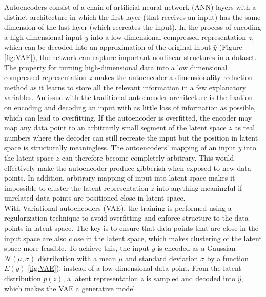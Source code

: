 \noindent
Autoencoders consist of a chain of artificial neural network (ANN) layers with a distinct architecture in which the first layer (that receives an input) has the same dimension of the last layer (which recreates the input). In the process of encoding a high-dimensional input $y$ into a low-dimensional compressed representation $z$, which can be decoded into an approximation of the original input $\hat{y}$ (Figure \ref{fig:VAE}), the network can capture important nonlinear structures in a dataset. The property for turning high-dimensional data into a low dimensional compressed representation $z$ makes the autoencoder a dimensionality reduction method as it learns to store all the relevant information in a few explanatory variables. An issue with the traditional autoencoder architecture is the fixation on encoding and decoding an input with as little loss of information as possible, which can lead to overfitting. If the autoencoder is overfitted, the encoder may map any data point to an arbitrarily small segment of the latent space $z$ as real numbers where the decoder can still recreate the input but the position in latent space is structurally meaningless. The autoencoders’ mapping of an input $y$ into the latent space $z$ can therefore become completely arbitrary. This would effectively make the autoencoder produce gibberish when exposed to new data points. In addition, arbitrary mapping of input into latent space makes it impossible to cluster the latent representation $z$ into anything meaningful if unrelated data points are positioned close in latent space.\\
\noindent
With Variational autoencoders (VAE), the training is performed using a regularization technique to avoid overfitting and enforce structure to the data points in latent space. The key is to ensure that data points that are close in the input space are also close in the latent space, which makes clustering of the latent space more feasible. To achieve this, the input $y$ is encoded as a Gaussian $\mathcal{N}(\mu, \sigma)$ distribution with a mean $\mu$ and standard deviation $\sigma$ by a function $E(y)$ \ref{fig:VAE}), instead of a low-dimensional data point. From the latent distribution $p(z)$, a latent representation $z$ is sampled and decoded into $\hat{y}$, which makes the VAE a generative model. 


